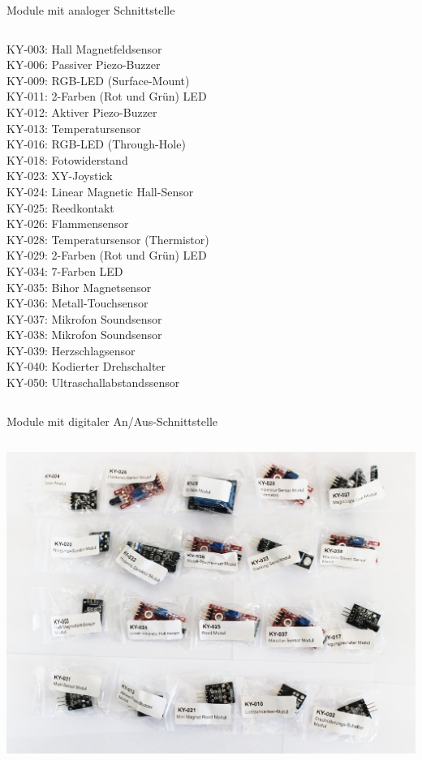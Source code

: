 {\begin{frame}{Module mit analoger Schnittstelle}
\begin{columns}
        KY-003: Hall Magnetfeldsensor \\
        KY-006: Passiver Piezo-Buzzer \\
        KY-009: RGB-LED (Surface-Mount) \\
        KY-011: 2-Farben (Rot und Grün) LED \\
        KY-012: Aktiver Piezo-Buzzer \\
        KY-013: Temperatursensor \\
        KY-016: RGB-LED (Through-Hole) \\
        KY-018: Fotowiderstand \\
        KY-023: XY-Joystick \\
        KY-024: Linear Magnetic Hall-Sensor \\
        KY-025: Reedkontakt \\
        KY-026: Flammensensor \\
        KY-028: Temperatursensor (Thermistor) \\
        KY-029: 2-Farben (Rot und Grün) LED \\
        KY-034: 7-Farben LED \\
        KY-035: Bihor Magnetsensor \\
        KY-036: Metall-Touchsensor \\
        KY-037: Mikrofon Soundsensor \\
        KY-038: Mikrofon Soundsensor \\
        KY-039: Herzschlagsensor \\
        KY-040: Kodierter Drehschalter \\
        KY-050: Ultraschallabstandssensor \\
    \end{columns}
\end{frame}

\begin{frame}{Module mit digitaler An/Aus-Schnittstelle}
    \begin{columns}
        \includegraphics[width=\textwidth]{2-hardwaredesign/img/sensorkit_digital}


\end{columns}
\end{frame}}
